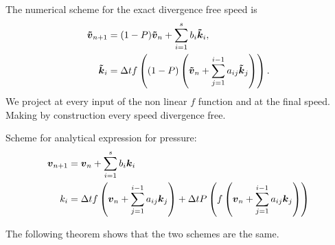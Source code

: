 The numerical scheme for the exact divergence free speed is
\begin{subequations}
\begin{align}
{\boldsymbol {\tilde{v}}}_{n+1}&=(1-P){\boldsymbol {\tilde{v}}}_{n}+\sum_{i=1}^{s}b_{i}{\boldsymbol {\tilde{k}}}_{i},\\
{\boldsymbol {\tilde{k}}}_{i}&=\Delta t f\left((1-P)\left({\boldsymbol {\tilde{v}}}_{n}+\sum_{j=1}^{i-1}a_{ij}{\boldsymbol {\tilde{k}}}_{j}\right)\right).
\end{align}
\end{subequations}
We project at every input of the non linear $f$ function and at the final speed. Making by construction every speed divergence free.

Scheme for analytical expression for pressure:
\begin{subequations}
\begin{align}
	{\boldsymbol {v}}_{n+1}&={\boldsymbol {v}}_{n}+\sum_{i=1}^{s}b_{i}{\boldsymbol {k}}_{i}\\
	k_{i}&=\Delta t f\left({\boldsymbol {v}}_{n}+\sum_{j=1}^{i-1}a_{ij}{\boldsymbol {k}}_{j}\right)+\Delta t P\left(f\left({\boldsymbol {v}}_{n}+\sum_{j=1}^{i-1}a_{ij}{\boldsymbol {k}}_{j}\right)\right)
\end{align}
\end{subequations}

The following theorem shows that the two schemes are the same.

